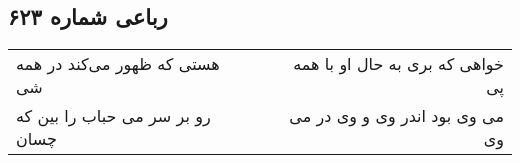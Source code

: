 \begin{center}
\section*{رباعی شماره ۶۲۳}
\label{sec:sh623}
\begin{longtable}{l p{0.5cm} r}
هستی که ظهور می‌کند در همه شی
&&
خواهی که بری به حال او با همه پی
\\
رو بر سر می حباب را بین که چسان
&&
می وی بود اندر وی و وی در می وی
\\
\end{longtable}
\end{center}
